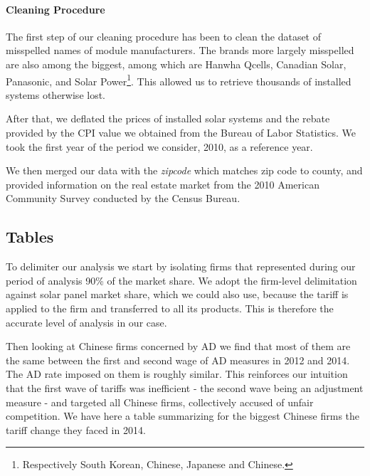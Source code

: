 \paragraph{Cleaning Procedure} The first step of our cleaning procedure has been to clean the dataset of misspelled names of module manufacturers. The brands more largely misspelled are also among the biggest, among which are Hanwha Qcells, Canadian Solar, Panasonic, and Solar Power\footnote{Respectively South Korean, Chinese, Japanese and Chinese.}. This allowed us to retrieve thousands of installed systems otherwise lost.

After that, we deflated the prices of installed solar systems and the rebate provided by the CPI value we obtained from the Bureau of Labor Statistics. We took the first year of the period we consider, 2010, as a reference year. 

We then merged our data with the \textit{zipcode} which matches zip code to county, and provided information on the real estate market from the 2010 American Community Survey conducted by the Census Bureau. 

\subsection{Tables} \label{app:tables}

To delimiter our analysis we start by isolating firms that represented during our period of analysis 90\% of the market share. We adopt the firm-level delimitation against solar panel market share, which we could also use, because the tariff is applied to the firm and transferred to all its products. This is therefore the accurate level of analysis in our case.

\begin{table}[H]
    \centering
    \caption{Market Share of Top 15 Manufacturers (2010-2020)}
    
    \label{tab:top_firms_10_20}
\end{table}

Then looking at Chinese firms concerned by AD we find that most of them are the same between the first and second wage of AD measures in 2012 and 2014. The AD rate imposed on them is roughly similar. This reinforces our intuition that the first wave of tariffs was inefficient - the second wave being an adjustment measure - and targeted all Chinese firms, collectively accused of unfair competition. We have here a table summarizing for the biggest Chinese firms the tariff change they faced in 2014. 


